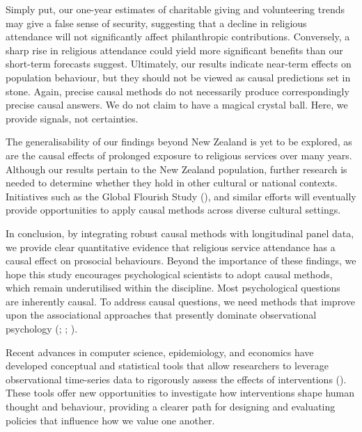 \documentclass[
  single column]{article}
\begin{document}
Simply put, our one-year estimates of charitable giving and volunteering
trends may give a false sense of security, suggesting that a decline in
religious attendance will not significantly affect philanthropic
contributions. Conversely, a sharp rise in religious attendance could
yield more significant benefits than our short-term forecasts suggest.
Ultimately, our results indicate near-term effects on population
behaviour, but they should not be viewed as causal predictions set in
stone. Again, precise causal methods do not necessarily produce
correspondingly precise causal answers. We do not claim to have a
magical crystal ball. Here, we provide signals, not certainties.

The generalisability of our findings beyond New Zealand is yet to be
explored, as are the causal effects of prolonged exposure to religious
services over many years. Although our results pertain to the New
Zealand population, further research is needed to determine whether they
hold in other cultural or national contexts. Initiatives such as the
Global Flourish Study (), and similar efforts will eventually provide
opportunities to apply causal methods across diverse cultural settings.

In conclusion, by integrating robust causal methods with longitudinal
panel data, we provide clear quantitative evidence that religious
service attendance has a causal effect on prosocial behaviours. Beyond
the importance of these findings, we hope this study encourages
psychological scientists to adopt causal methods, which remain
underutilised within the discipline. Most psychological questions are
inherently causal. To address causal questions, we need methods that
improve upon the associational approaches that presently dominate
observational psychology (; ;
).

Recent advances in computer science, epidemiology, and economics have
developed conceptual and statistical tools that allow researchers to
leverage observational time-series data to rigorously assess the effects
of interventions (). These tools offer new opportunities to investigate how
interventions shape human thought and behaviour, providing a clearer
path for designing and evaluating policies that influence how we value
one another.
\end{document}
